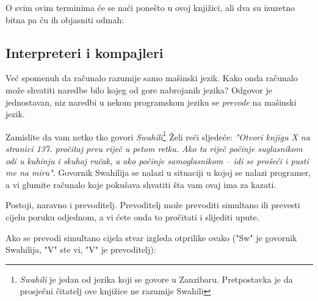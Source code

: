 	O svim ovim terminima \'{c}e se na\'{c}i pone\v{s}to u ovoj knji\v{z}ici, ali dva
	su izuzetno bitna pa \'{c}u ih objasniti odmah:

\subsection{Interpreteri i kompajleri}

	Ve\'{c} spomenuh da ra\v{c}unalo razumije samo ma\v{s}inski jezik. Kako onda
	ra\v{c}unalo mo\v{z}e shvatiti naredbe bilo kojeg od gore nabrojanih jezika?
	Odgovor je jednostavan, niz naredbi u nekom programskom jeziku se \emph{prevode} na
	ma\v{s}inski jezik. 

	Zamislite da vam netko tko govori \emph{Swahili}\footnote{\emph{Swahili}
	je jedan od jezika koji se govore u Zanzibaru. Pretpostavka je da prosje\v{c}ni
	\v{c}itatelj ove knji\v{z}ice ne razumije Swahili} \v{Z}eli re\'{c}i sljede\'{c}e:
	\emph{"Otvori knjigu X na stranici 137. pro\v{c}itaj prvu rije\v{c} u petom retku.
	Ako ta rije\v{c} po\v{c}inje suglasnikom odi u kuhinju i skuhaj ru\v{c}ak, a ako
	po\v{c}inje samoglasnikom -- idi se pro\v{s}e\'{c}i i pusti me na miru"}.
	Govornik Swahilija se nalazi u situaciji u kojoj se nalazi programer, a vi glumite
	ra\v{c}unalo koje poku\v{s}ava shvatiti \v{s}ta vam ovaj ima za kazati. 
	
	Postoji, naravno i prevoditelj. Prevoditelj mo\v{z}e prevoditi simultano ili
	prevesti cijelu poruku odjednom, a vi \'{c}ete onda to pro\v{c}itati i slijediti
	upute. 

	Ako se prevodi simultano cijela stvar izgleda otprilike ovako ("Sw" je govornik
	Swahilija, "V" ste vi, "V" je prevoditelj):

